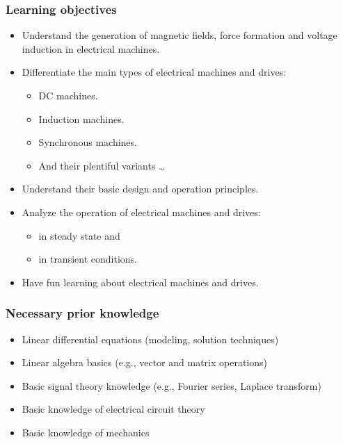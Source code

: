 \begin{frame}
	\frametitle{Learning objectives}
	\begin{itemize}
		\item Understand the generation of magnetic fields, force formation and voltage induction in electrical machines.
		\item Differentiate the main types of electrical machines and drives:
		\begin{itemize}
			\item DC machines. 
			\item Induction machines.
			\item Synchronous machines.
			\item And their plentiful variants \ldots
		\end{itemize}
		\item Understand their basic design and operation principles.
		\item Analyze the operation of electrical machines and drives:
		\begin{itemize}
			\item in steady state and
			\item in transient conditions.
		\end{itemize} 
		\item Have fun learning about electrical machines and drives.
	\end{itemize}
\end{frame}

\begin{frame}
	\frametitle{Necessary prior knowledge}
	\begin{itemize}
		\item Linear differential equations (modeling, solution techniques)
		\item Linear algebra basics (e.g., vector and matrix operations)
		\item Basic signal theory knowledge (e.g., Fourier series, Laplace transform)
		\item Basic knowledge of electrical circuit theory
		\item Basic knowledge of mechanics
	\end{itemize}
\end{frame}

